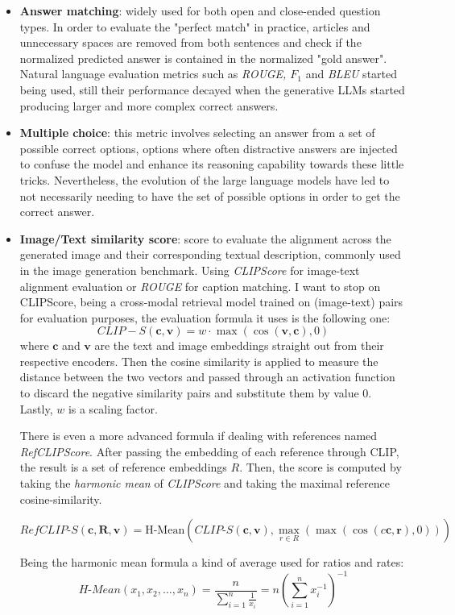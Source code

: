 \begin{itemize}
	\item \textbf{Answer matching}: widely used for both open and close-ended question types. In order to evaluate the "perfect match" in practice, articles and unnecessary spaces are removed from both sentences and check if the normalized predicted answer is contained in the normalized "gold answer". Natural language evaluation metrics such as \textit{ROUGE, $F_{1}$} and \textit{BLEU} started being used, still their performance decayed when the generative LLMs started producing larger and more complex correct answers.
	
	\item \textbf{Multiple choice}: this metric involves selecting an answer from a set of possible correct options, options where often distractive answers are injected to confuse the model and enhance its reasoning capability towards these little tricks. Nevertheless, the evolution of the large language models have led to not necessarily needing to have the set of possible options in order to get the correct answer. 
	
	\item \textbf{Image/Text similarity score}: score to evaluate the alignment across the generated image and their corresponding textual description, commonly used in the image generation benchmark. Using \textit{CLIPScore} \cite{hessel2022clipscorereferencefreeevaluationmetric} for image-text alignment evaluation or \textit{ROUGE} for caption matching. I want to stop on CLIPScore, being a cross-modal retrieval model trained on (image-text) pairs for evaluation purposes, the evaluation formula it uses is the following one: 
	$$CLIP-S(\mathbf{c}, \mathbf{v}) = w \cdot \max(\cos(\mathbf{v}, \mathbf{c}), 0)$$
	where $\mathbf{c}$ and $\mathbf{v}$ are the text and image embeddings straight out from their respective encoders. Then the cosine similarity is applied to measure the distance between the two vectors and passed through an activation function to discard the negative similarity pairs and substitute them by value 0. Lastly, $w$ is a scaling factor.
	
	There is even a more advanced formula if dealing with references named \textit{RefCLIPScore}. After passing the embedding of each reference through CLIP, the result is a set of reference embeddings $R$. Then, the score is computed by taking the \textit{harmonic mean} of \textit{CLIPScore} and taking the maximal reference cosine-similarity.
	
	$$RefCLIP\text{-}S(\mathbf{c}, \mathbf{R}, \mathbf{v}) = \text{H-Mean}\left(CLIP\text{-}S(\mathbf{c}, \mathbf{v}), \max_{r \in R} (\max(\cos(c\mathbf{c}, \mathbf{r}), 0))\right)$$
	
	Being the harmonic mean formula a kind of average used for ratios and rates: 
	$$H\text{-}Mean(x_1, x_2, \dots, x_n) = \frac{n}{\sum_{i=1}^{n} \frac{1}{x_i}} = n \left( \sum_{i=1}^{n} x_i^{-1} \right)^{-1}$$
\end{itemize}

